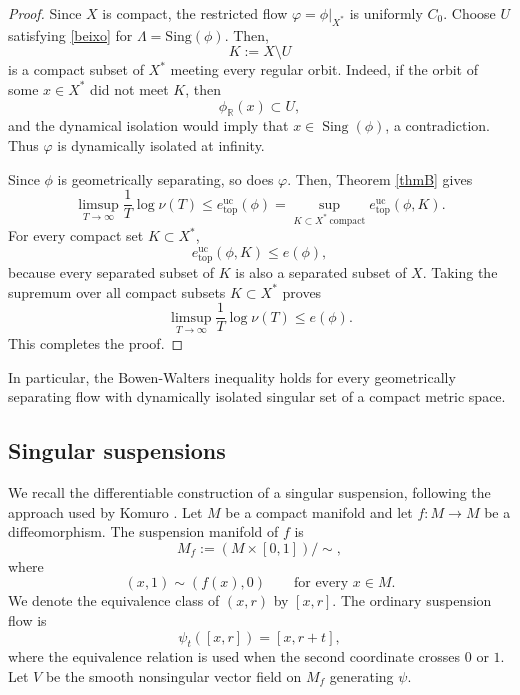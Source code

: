 \documentclass[11pt,reqno]{amsart}
\theoremstyle{definition}
\theoremstyle{remark}
\newcommand{\Sing}{\operatorname{Sing}}
\newcommand{\hE}{e^{\mathrm{uc}}_{\mathrm{top}}}
\begin{document}
\begin{proof}
Since $X$ is compact, the restricted flow $\varphi=\phi|_{X^*}$ is uniformly
$C_0$. Choose $U$ satisfying \eqref{beixo} for $\Lambda=\mathrm{Sing}(\phi)$. Then,
\[
K:=X\setminus U
\]
is a compact subset of $X^*$ meeting every regular orbit. Indeed, if the
orbit of some $x\in X^*$ did not meet $K$, then
\[
\phi_{\mathbb R}(x)\subset U,
\]
and the dynamical isolation would imply that
$x\in\Sing(\phi)$, a contradiction. Thus $\varphi$ is dynamically
isolated at infinity.

Since $\phi$ is geometrically separating, so does $\varphi$.
Then, Theorem \ref{thmB} gives
\[
\limsup_{T\to\infty}\frac{1}{T}\log\nu(T)
\leq \hE(\phi)=\sup_{K\subset X^*\  \mathrm{compact}}\hE(\phi,K).
\]
For every compact set $K\subset X^*$,
\[
\hE(\phi,K)\leq e(\phi),
\]
because every separated subset of $K$ is also a separated subset of $X$.
Taking the supremum over all compact subsets $K\subset X^*$ proves
\[
\limsup_{T\to\infty}\frac{1}{T}\log\nu(T)
\leq e(\phi).
\]
This completes the proof.
\end{proof}



In particular, the Bowen-Walters inequality holds
for every geometrically separating flow with dynamically isolated singular set of a compact metric space.






















\subsection{Singular suspensions}
We recall the differentiable construction of a singular suspension, following
the approach used by Komuro \cite{k}. Let $M$ be a compact manifold and let
$f\colon M\to M$ be a diffeomorphism. The suspension manifold of $f$ is
\[
M_f
:=
(M\times[0,1])/\!\sim,
\]
where
\[
(x,1)\sim(f(x),0)
\qquad\text{for every }x\in M.
\]
We denote the equivalence class of $(x,r)$ by $[x,r]$. The ordinary
suspension flow is
\[
\psi_t([x,r])=[x,r+t],
\]
where the equivalence relation is used when the second coordinate crosses
$0$ or $1$. Let $V$ be the smooth nonsingular vector field on $M_f$
generating $\psi$.
\end{document}
